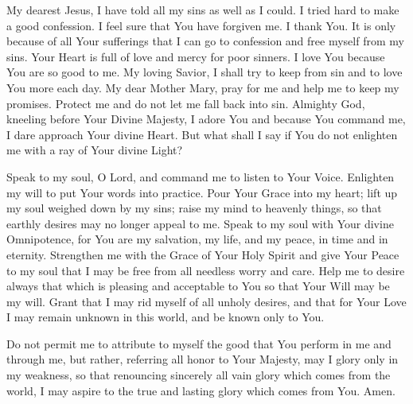 My dearest Jesus, I have told all my sins as well as I could.
I tried hard to make a good confession.
I feel sure that You have forgiven me.
I thank You.
It is only because of all Your sufferings that I can go to confession and free myself from my sins.
Your Heart is full of love and mercy for poor sinners.
I love You because You are so good to me.
My loving Savior, I shall try to keep from sin and to love You more each day.
My dear Mother Mary, pray for me and help me to keep my promises.
Protect me and do not let me fall back into sin.
Almighty God, kneeling before Your Divine Majesty, I adore You and because You command me, I dare approach Your divine Heart.
But what shall I say if You do not enlighten me with a ray of Your divine Light?

Speak to my soul, O Lord, and command me to listen to Your Voice.
Enlighten my will to put Your words into practice.
Pour Your Grace into my heart;
lift up my soul weighed down by my sins;
raise my mind to heavenly things, so that earthly desires may no longer appeal to me.
Speak to my soul with Your divine Omnipotence, for You are my salvation, my life, and my peace, in time and in eternity.
Strengthen me with the Grace of Your Holy Spirit and give Your Peace to my soul that I may be free from all needless worry and care.
Help me to desire always that which is pleasing and acceptable to You so that Your Will may be my will.
Grant that I may rid myself of all unholy desires, and that for Your Love I may remain unknown in this world, and be known only to You.

Do not permit me to attribute to myself the good that You perform in me and through me, but rather, referring all honor to Your Majesty, may I glory only in my weakness, so that renouncing sincerely all vain glory which comes from the world, I may aspire to the true and lasting glory which comes from You. Amen.

\newpage